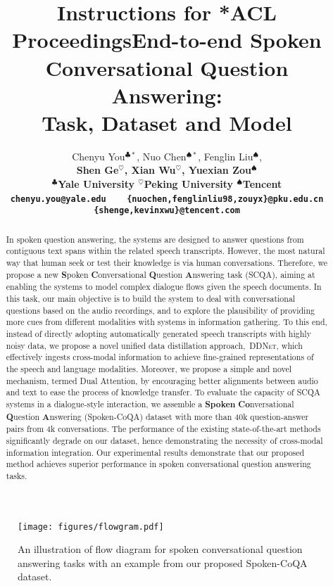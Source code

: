 \documentclass[11pt]{article}
\title{Instructions for *ACL Proceedings}
\title{End-to-end Spoken Conversational Question Answering: \\ Task, Dataset and Model}
\author{Chenyu You$^{\clubsuit*}$, Nuo Chen$^{\spadesuit*}$, Fenglin Liu$^{\spadesuit}$, \\ \bf{Shen Ge$^{\heartsuit}$,} Xian Wu$^{\heartsuit}$, Yuexian Zou$^{\spadesuit}$ \\ \textit{}
$^\clubsuit$Yale University $^\heartsuit$Peking University $^\spadesuit$Tencent \\
  \texttt{chenyu.you@yale.edu}~~~ \texttt{\{nuochen,fenglinliu98,zouyx\}@pku.edu.cn} \\ \texttt{\{shenge,kevinxwu\}@tencent.com} \\
}
\begin{document}
\maketitle
\renewcommand{\thefootnote}{\fnsymbol{footnote}}
\renewcommand{\thefootnote}{\arabic{footnote}}


\begin{abstract}
In spoken question answering, the systems are designed to answer questions from contiguous text spans within the related speech transcripts. However, the most natural way that human seek or test their knowledge is via human conversations. Therefore, we propose a new \textbf{S}poken \textbf{C}onversational \textbf{Q}uestion \textbf{A}nswering task (SCQA), aiming at enabling the systems to model complex dialogue flows given the speech documents. In this task, our main objective is to build the system to deal with conversational questions based on the audio recordings, and to explore the plausibility of providing more cues from different modalities with systems in information gathering. To this end, instead of directly adopting automatically generated speech transcripts with highly noisy data, we propose a novel unified data distillation approach,~\textsc{DDNet}, which effectively ingests cross-modal information to achieve fine-grained representations of the speech and language modalities. Moreover, we propose a simple and novel mechanism, termed Dual Attention, by encouraging better alignments between audio and text to ease the process of knowledge transfer. To evaluate the capacity of SCQA systems in a dialogue-style interaction, we assemble a \textbf{Spoken} \textbf{Co}nversational \textbf{Q}uestion \textbf{A}nswering (Spoken-CoQA) dataset with more than 40k question-answer pairs from 4k conversations. The performance of the existing state-of-the-art methods significantly degrade on our dataset, hence demonstrating the necessity of cross-modal information integration. Our experimental results demonstrate that our proposed method achieves superior performance in spoken conversational question answering tasks.
\end{abstract} 
\begin{figure*}
\begin{center}
\texttt{[image: figures/flowgram.pdf]} \end{center}
\vspace{-10pt}
\caption{An illustration of flow diagram for spoken conversational question answering tasks with an example from our proposed Spoken-CoQA dataset.}
\label{fig:framework}
\vspace{-5pt}
\end{figure*}
\end{document}
